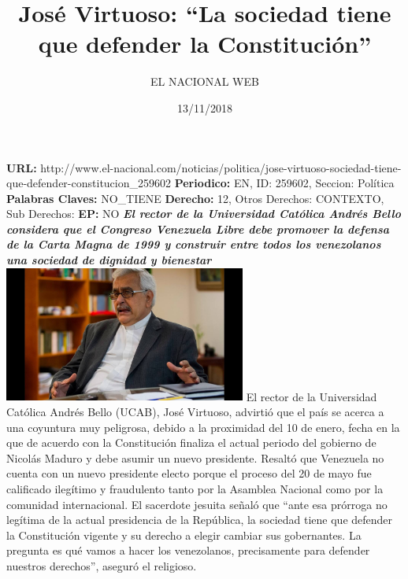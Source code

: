 \documentclass{article}%
\title{\textbf{José Virtuoso: “La sociedad tiene que defender la Constitución”}}%
\author{EL NACIONAL WEB}%
\date{13/11/2018}%
\begin{document}
%
\normalsize%
\maketitle%
\textbf{URL: }%
http://www.el{-}nacional.com/noticias/politica/jose{-}virtuoso{-}sociedad{-}tiene{-}que{-}defender{-}constitucion\_259602\newline%
%
\textbf{Periodico: }%
EN, %
ID: %
259602, %
Seccion: %
Política\newline%
%
\textbf{Palabras Claves: }%
NO\_TIENE\newline%
%
\textbf{Derecho: }%
12, %
Otros Derechos: %
CONTEXTO, %
Sub Derechos: %
\newline%
%
\textbf{EP: }%
NO\newline%
\newline%
%
\textbf{\textit{El rector de la Universidad Católica Andrés Bello considera que el Congreso Venezuela Libre debe promover la defensa de la Carta Magna de 1999 y construir entre todos los venezolanos una sociedad de dignidad y bienestar}}%
\newline%
\newline%
%
\includegraphics[width=300px]{66.jpg}%
\newline%
%
El rector de la Universidad Católica Andrés Bello (UCAB), José Virtuoso, advirtió que el país se acerca a una coyuntura muy peligrosa, debido a la proximidad del 10 de enero, fecha en la que de acuerdo con la Constitución finaliza el actual periodo del gobierno de Nicolás Maduro y debe asumir un nuevo presidente.%
\newline%
%
Resaltó que Venezuela no cuenta con un nuevo presidente electo porque el proceso del 20 de mayo fue calificado ilegítimo y fraudulento tanto por la Asamblea Nacional como por la comunidad internacional.%
\newline%
%
El sacerdote jesuita señaló que “ante esa prórroga no legítima de la actual presidencia de la República, la sociedad tiene que defender la Constitución vigente y su derecho a elegir cambiar sus gobernantes. La pregunta es qué vamos a hacer los venezolanos, precisamente para defender nuestros derechos”, aseguró el religioso.%
\end{document}
